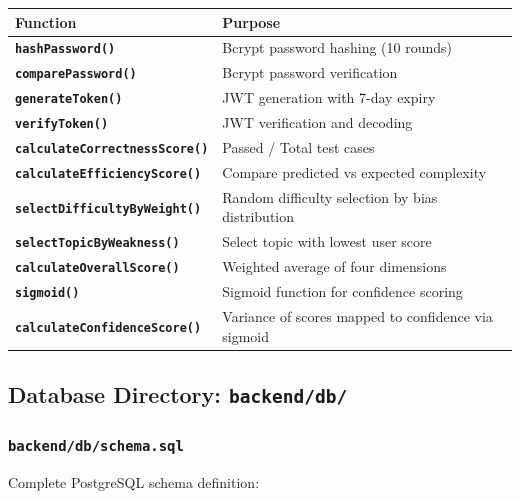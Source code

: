 \documentclass[12pt,a4paper,oneside]{article}
\newcommand{\fileref}[1]{\texttt{#1}}
\newcommand{\funcname}[1]{\texttt{\textbf{#1}}}
\begin{document}
\begin{table}[H]
\centering
\begin{tabular}{|p{3.5cm}|p{10cm}|}
\hline
\textbf{Function} & \textbf{Purpose} \\
\hline
\funcname{hashPassword()} & Bcrypt password hashing (10 rounds) \\
\hline
\funcname{comparePassword()} & Bcrypt password verification \\
\hline
\funcname{generateToken()} & JWT generation with 7-day expiry \\
\hline
\funcname{verifyToken()} & JWT verification and decoding \\
\hline
\funcname{calculateCorrectnessScore()} & Passed / Total test cases \\
\hline
\funcname{calculateEfficiencyScore()} & Compare predicted vs expected complexity \\
\hline
\funcname{selectDifficultyByWeight()} & Random difficulty selection by bias distribution \\
\hline
\funcname{selectTopicByWeakness()} & Select topic with lowest user score \\
\hline
\funcname{calculateOverallScore()} & Weighted average of four dimensions \\
\hline
\funcname{sigmoid()} & Sigmoid function for confidence scoring \\
\hline
\funcname{calculateConfidenceScore()} & Variance of scores mapped to confidence via sigmoid \\
\hline
\end{tabular}
\end{table}

\newpage

\subsection{Database Directory: \fileref{backend/db/}}

\subsubsection{\fileref{backend/db/schema.sql}}

Complete PostgreSQL schema definition:
\end{document}
